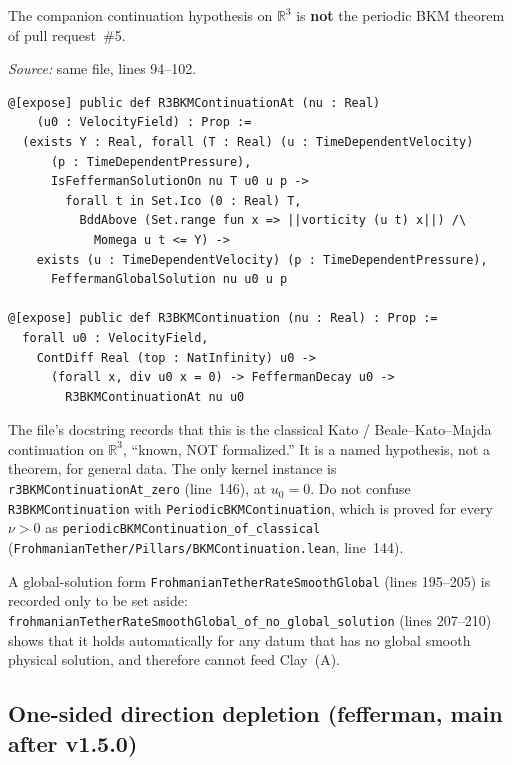 \documentclass[11pt]{article}
\theoremstyle{plain}
\theoremstyle{definition}
\theoremstyle{remark}
\newcommand{\R}{\mathbb{R}}
\begin{document}
The companion continuation hypothesis on \(\R^{3}\) is \textbf{not} the periodic BKM theorem of pull request~\#5.

\newpage
\textit{Source:} same file, lines 94--102.
\begin{lstlisting}
@[expose] public def R3BKMContinuationAt (nu : Real)
    (u0 : VelocityField) : Prop :=
  (exists Y : Real, forall (T : Real) (u : TimeDependentVelocity)
      (p : TimeDependentPressure),
      IsFeffermanSolutionOn nu T u0 u p ->
        forall t in Set.Ico (0 : Real) T,
          BddAbove (Set.range fun x => ||vorticity (u t) x||) /\
            Momega u t <= Y) ->
    exists (u : TimeDependentVelocity) (p : TimeDependentPressure),
      FeffermanGlobalSolution nu u0 u p

@[expose] public def R3BKMContinuation (nu : Real) : Prop :=
  forall u0 : VelocityField,
    ContDiff Real (top : NatInfinity) u0 ->
      (forall x, div u0 x = 0) -> FeffermanDecay u0 ->
        R3BKMContinuationAt nu u0
\end{lstlisting}
The file's docstring records that this is the classical Kato / Beale--Kato--Majda continuation on \(\R^{3}\), ``known, NOT formalized.'' It is a named hypothesis, not a theorem, for general data. The only kernel instance is \texttt{r3BKMContinuationAt\_\hspace{0pt}zero} (line~146), at \(u_{0}=0\). Do not confuse \texttt{R3BKMContinuation} with \texttt{PeriodicBKMContinuation}, which is proved for every \(\nu>0\) as \texttt{periodicBKMContinuation\_\hspace{0pt}of\_\hspace{0pt}classical} (\texttt{FrohmanianTether/\hspace{0pt}Pillars/\hspace{0pt}BKMContinuation.\hspace{0pt}lean}, line~144).

A global-solution form \texttt{FrohmanianTetherRateSmooth\allowbreak Global} (lines 195--205) is recorded only to be set aside: \texttt{frohmanianTetherRateSmoothGlobal\_\hspace{0pt}of\_\hspace{0pt}no\_\hspace{0pt}global\_\hspace{0pt}solution} (lines 207--210) shows that it holds automatically for any datum that has no global smooth physical solution, and therefore cannot feed Clay~(A).

\subsection{One-sided direction depletion (fefferman, main after v1.5.0)}
\end{document}
